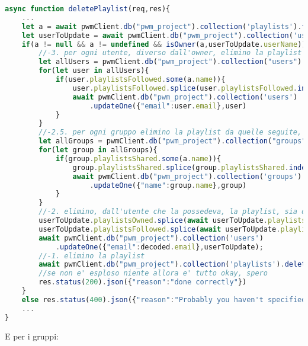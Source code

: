 \begin{lstlisting}[language=Javascript]
    async function deletePlaylist(req,res){
    ...
    let a = await pwmClient.db("pwm_project").collection('playlists').findOne({"name": validator.escape(req.params.name)})
    let userToUpdate = await pwmClient.db("pwm_project").collection('users').findOne({"email":decoded.email});
    if(a != null && a != undefined && isOwner(a,userToUpdate.userName)){
        //-3. per ogni utente, diverso dall'owner, elimino la playlist da quelle seguite, laddove presente.
        let allUsers = pwmClient.db("pwm_project").collection("users").find({"email":{$not: decoded.email}})
        for(let user in allUsers){
            if(user.playlistsFollowed.some(a.name)){
                user.playlistsFollowed.splice(user.playlistsFollowed.indexOf(a.name),1)
                await pwmClient.db("pwm_project").collection('users')
                    .updateOne({"email":user.email},user)
            }
        }
        //-2.5. per ogni gruppo elimino la playlist da quelle seguite, laddove presente
        let allGroups = pwmClient.db("pwm_project").collection("groups").find({})
        for(let group in allGroups){
            if(group.playlistsShared.some(a.name)){
                group.playlistsShared.splice(group.playlistsShared.indexOf(a.name),1)
                await pwmClient.db("pwm_project").collection('groups')
                    .updateOne({"name":group.name},group)
            }
        }
        //-2. elimino, dall'utente che la possedeva, la playlist, sia da quelle seguite che da quelle totali (aka assicuro integrita' referenziale)
        userToUpdate.playlistsOwned.splice(await userToUpdate.playlistsOwned.indexOf(a.name),1)
        userToUpdate.playlistsFollowed.splice(await userToUpdate.playlistsFollowed.indexOf(a.name),1)
        await pwmClient.db("pwm_project").collection('users')
            .updateOne({"email":decoded.email},userToUpdate);
        //-1. elimino la playlist
        await pwmClient.db("pwm_project").collection('playlists').deleteOne(a)
        //se non e' esploso niente allora e' tutto okay, spero
        res.status(200).json({"reason":"done correctly"})
    }
    else res.status(400).json({"reason":"Probably you haven't specified the right params"})
    ...
}
\end{lstlisting}
E per i gruppi:

